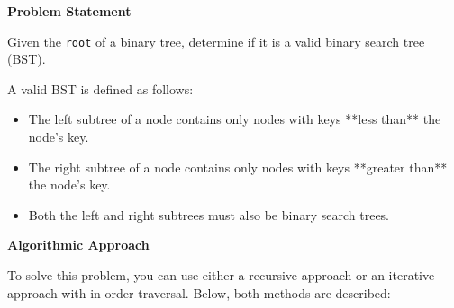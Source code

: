 

\textbf{Problem Statement}

Given the \texttt{root} of a binary tree, determine if it is a valid binary search tree (BST).

A valid BST is defined as follows:
\begin{itemize}
    \item The left subtree of a node contains only nodes with keys **less than** the node's key.
    \item The right subtree of a node contains only nodes with keys **greater than** the node's key.
    \item Both the left and right subtrees must also be binary search trees.
\end{itemize}

\textbf{Algorithmic Approach}

To solve this problem, you can use either a recursive approach or an iterative approach with in-order traversal. Below, both methods are described:

